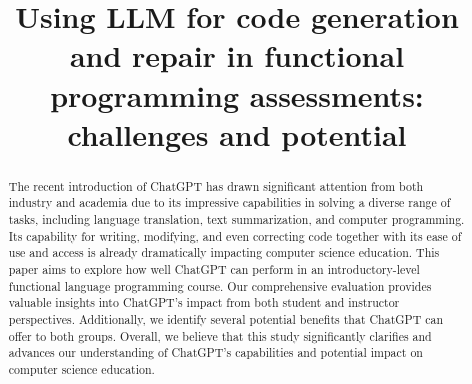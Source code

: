 \documentclass[sigconf,authordraft]{acmart}
\begin{document}
\title{Using LLM for code generation and repair in functional programming assessments: challenges and potential
}



\renewcommand{\shortauthors}{Trovato et al.}

\begin{abstract}


The recent introduction of ChatGPT has drawn significant attention
from both industry and academia due to its impressive capabilities in
solving a diverse range of tasks, including language translation, text
summarization, and computer programming.
Its capability for writing, modifying, and even
correcting code together with its ease of use and access is already 
dramatically impacting computer science education. 
This paper aims to explore how well ChatGPT can perform in an
introductory-level functional language programming course.  Our comprehensive evaluation provides valuable
insights into ChatGPT's impact from both student and instructor
perspectives. Additionally, we identify several potential benefits
that ChatGPT can offer to both groups. Overall, we believe that this
study significantly clarifies and advances our understanding of
ChatGPT's capabilities and potential impact on computer science education.
\end{abstract}
\end{document}
